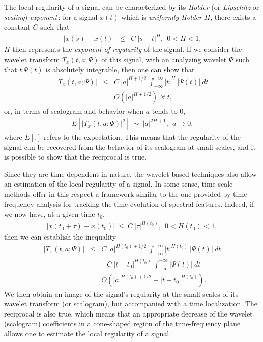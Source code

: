  The local regularity of a signal can be characterized by its {\it Holder}
(or {\it Lipschitz} or {\it scaling}) {\it exponent}\,: for a signal $x(t)$
which is {\it uniformly Holder} $H$, there exists a constant $C$ such that
\begin{eqnarray*}
|x(s)-x(t)|\ \ \leq\ \ C\ |s-t|^H,\ \ 0<H<1.
\end{eqnarray*}
$H$ then represents the {\it exponent of regularity} of the signal. If we consider the wavelet transform
$T_x(t,a;\Psi)$ of this signal, with an analyzing wavelet $\Psi$ such that
$t\ \Psi(t)$ is absolutely integrable, then one can show that
\begin{eqnarray*}
|T_x(t,a;\Psi)|&\leq& C\ |a|^{H+1/2}\ \int_{-\infty}^{+\infty} |t|^H\
|\Psi(t)|\ dt\\ 
 &=& O(|a|^{H+1/2})\ \ \forall\ t,
\end{eqnarray*}
or, in terms of scalogram and behavior when $a$ tends to 0, 
\begin{eqnarray*}
E\left[|T_x(t,a;\Psi)|^2\right] \ \sim\ |a|^{2H+1},\ \ a\rightarrow 0.
\end{eqnarray*}
where $E[.]$ refers to the expectation. This means that the regularity
of the signal can be recovered from the behavior of its scalogram at
small scales, and it is possible to show that the reciprocal is true.

  Since they are time-dependent in nature, the wavelet-based
techniques also allow an estimation of the local regularity of a
signal. In some sense, time-scale methods offer in this respect a
framework similar to the one provided by time-frequency analysis for
tracking the time evolution of spectral features. Indeed, if we now
have, at a given time $t_0$,
\begin{eqnarray}
\label{regularity}
|x(t_0+\tau)-x(t_0)|\ \leq\ C\ |\tau|^{H(t_0)},\ \ 0<H(t_0)<1,
\end{eqnarray}
then we can establish the inequality
\begin{eqnarray*}
|T_x(t,a;\Psi)|&\leq& C\ |a|^{H(t_0)+1/2}\ \int_{-\infty}^{+\infty}
|t|^{H(t_0)}\ |\Psi(t)|\ dt \\ 
 &&+ C\ |t-t_0|^{H(t_0)}\ \int_{-\infty}^{+\infty} |\Psi(t)|\ dt\\ 
 &=& O(|a|^{H(t_0)+1/2} + |t-t_0|^{H(t_0)}).
\end{eqnarray*}
We then obtain an image of the signal's regularity at the small scales
of its wavelet transform (or scalogram), but accompanied with a time
localization. The reciprocal is also true, which means that an
appropriate decrease of the wavelet (scalogram) coefficients in a
cone-shaped region of the time-frequency plane allows one to estimate
the local regularity of a signal.

